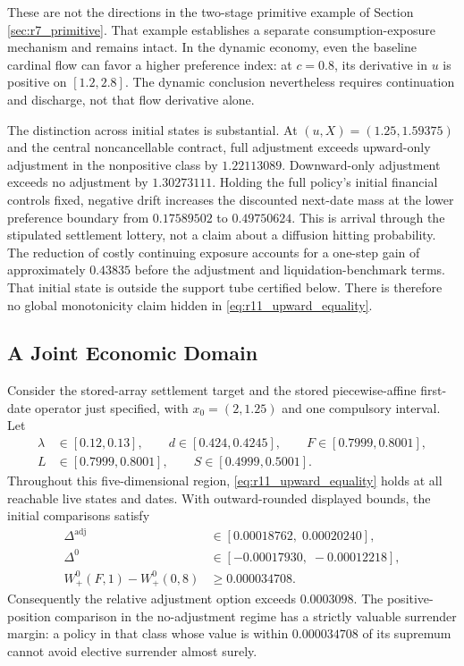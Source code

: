 These are not the directions in the two-stage primitive example of Section \ref{sec:r7_primitive}. That example establishes a separate consumption-exposure mechanism and remains intact. In the dynamic economy, even the baseline cardinal flow can favor a higher preference index: at $c=0.8$, its derivative in $u$ is positive on $[1.2,2.8]$. The dynamic conclusion nevertheless requires continuation and discharge, not that flow derivative alone.

The distinction across initial states is substantial. At $(u,X)=(1.25,1.59375)$ and the central noncancellable contract, full adjustment exceeds upward-only adjustment in the nonpositive class by $1.22113089$. Downward-only adjustment exceeds no adjustment by $1.30273111$. Holding the full policy's initial financial controls fixed, negative drift increases the discounted next-date mass at the lower preference boundary from $0.17589502$ to $0.49750624$. This is arrival through the stipulated settlement lottery, not a claim about a diffusion hitting probability. The reduction of costly continuing exposure accounts for a one-step gain of approximately $0.43835$ before the adjustment and liquidation-benchmark terms. That initial state is outside the support tube certified below. There is therefore no global monotonicity claim hidden in \eqref{eq:r11_upward_equality}.

\subsection{A Joint Economic Domain}
\begin{theorem}
\label{thm:r11_joint}
Consider the stored-array settlement target and the stored piecewise-affine first-date operator just specified, with $x_0=(2,1.25)$ and one compulsory interval. Let
\begin{equation}
\begin{split}
 \lambda&\in[0.12,0.13],\qquad d\in[0.424,0.4245],\qquad
 F\in[0.7999,0.8001],\\
 L&\in[0.7999,0.8001],\qquad S\in[0.4999,0.5001].
\end{split}
\label{eq:r11_box}
\end{equation}
Throughout this five-dimensional region, \eqref{eq:r11_upward_equality} holds at all reachable live states and dates. With outward-rounded displayed bounds, the initial comparisons satisfy
\begin{align}
 \Delta^{\mathrm{adj}}&\in[0.00018762,\;0.00020240],\label{eq:r11_adj_bound}\\
 \Delta^0&\in[-0.00017930,\;-0.00012218],\label{eq:r11_zero_bound}\\
 W^0_+(F,1)-W^0_+(0,8)&\geq0.000034708.
 \label{eq:r11_active_bound}
\end{align}
Consequently the relative adjustment option exceeds $0.0003098$. The positive-position comparison in the no-adjustment regime has a strictly valuable surrender margin: a policy in that class whose value is within $0.000034708$ of its supremum cannot avoid elective surrender almost surely.
\end{theorem}


